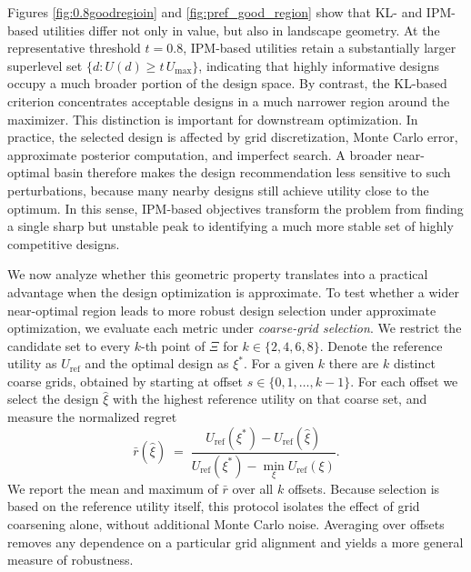 \documentclass[twoside,11pt]{article}
\begin{document}
Figures \ref{fig:0.8goodregioin} and \ref{fig:pref_good_region} show that KL- and IPM-based utilities differ not only in value, but also in landscape geometry. At the representative threshold $t=0.8$, IPM-based utilities retain a substantially larger superlevel set $\{d : U(d) \ge t\,U_{\max}\}$, indicating that highly informative designs occupy a much broader portion of the design space. By contrast, the KL-based criterion concentrates acceptable designs in a much narrower region around the maximizer. This distinction is important for downstream optimization. In practice, the selected design is affected by grid discretization, Monte Carlo error, approximate posterior computation, and imperfect search. A broader near-optimal basin therefore makes the design recommendation less sensitive to such perturbations, because many nearby designs still achieve utility close to the optimum. In this sense, IPM-based objectives transform the problem from finding a single sharp but unstable peak to identifying a much more stable set of highly competitive designs.

We now analyze whether this geometric property translates into a practical
advantage when the design optimization is approximate. To test whether a wider near-optimal region leads to more robust design
selection under approximate optimization, we evaluate each metric under
\emph{coarse-grid selection}. We restrict the candidate set to every $k$-th
point of $\Xi$ for $k \in \{2, 4, 6, 8\}$. Denote the reference utility as $U_{\mathrm{ref}}$ and the optimal design as $\xi^*$.
For a given $k$ there are $k$ distinct coarse grids, obtained by starting
at offset $s \in \{0, 1, \ldots, k-1\}$.
For each offset we select the design $\hat\xi$ with the highest reference utility on that coarse set, and measure the
normalized regret
\begin{equation*}
  \bar{r}(\hat\xi) \;=\;
  \frac{U_{\mathrm{ref}}(\xi^*) - U_{\mathrm{ref}}(\hat\xi)}
       {U_{\mathrm{ref}}(\xi^*) - \min_{\xi}U_{\mathrm{ref}}(\xi)}.
  \label{eq:norm_regret}
\end{equation*}
We report the mean and maximum of $\bar{r}$ over all $k$ offsets.
Because selection is based on the reference utility itself, this protocol isolates the effect of grid coarsening alone, without additional Monte Carlo noise.
Averaging over offsets removes any dependence on a particular grid
alignment and yields a more general measure of robustness.
\end{document}
